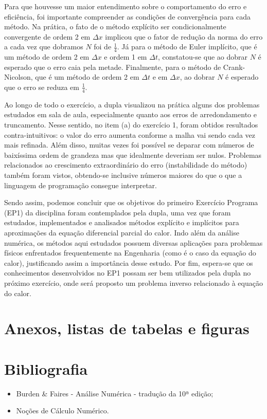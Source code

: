 \documentclass[a4paper, 12pt]{article}
\begin{document}
Para que houvesse um maior entendimento sobre o comportamento do erro e eficiência, foi importante compreender as condições de convergência para cada método. Na prática, o fato de o método explícito ser condicionalmente convergente de ordem 2 em $\Delta x$ implicou que o fator de redução da norma do erro a cada vez que dobramos $N$ foi de $\frac{1}{4}$. Já para o método de Euler implícito, que é um método de ordem 2 em $\Delta x$ e ordem 1 em $\Delta t$, constatou-se que ao dobrar $N$ é esperado que o erro caia pela metade. Finalmente, para o método de Crank-Nicolson, que é um método de ordem 2 em $\Delta t$ e em $\Delta x$, ao dobrar $N$ é esperado que o erro se reduza em $\frac{1}{4}$.

Ao longo de todo o exercício, a dupla visualizou na prática alguns dos problemas estudados em sala de aula, especialmente quanto aos erros de arredondamento e truncamento. Nesse sentido, no item (a) do exercício 1, foram obtidos resultados contra-intuitivos: o valor do erro aumenta conforme a malha vai sendo cada vez mais refinada. Além disso, muitas vezes foi possível se deparar com números de baixíssima ordem de grandeza mas que idealmente deveriam ser nulos. Problemas relacionados ao crescimento extraordinário do erro (instabilidade do método) também foram vistos, obtendo-se inclusive números maiores do que o que a linguagem de programação consegue interpretar.

Sendo assim, podemos concluir que os objetivos do primeiro Exercício Programa (EP1) da disciplina foram contemplados pela dupla, uma vez que foram estudados, implementados e analisados métodos explícito e implícitos para aproximações da equação diferencial parcial do calor. Indo além da análise numérica, os métodos aqui estudados possuem diversas aplicações para problemas físicos enfrentados frequentemente na Engenharia (como é o caso da equação do calor), justificando assim a importância desse estudo. Por fim, espera-se que os conhecimentos desenvolvidos no EP1 possam ser bem utilizados pela dupla no próximo exercício, onde será proposto um problema inverso relacionado à equação do calor.


\section{Anexos, listas de tabelas e figuras}

\listoftables


\listoffigures

\newpage

\section{Bibliografia}

\begin{itemize}
	
	
	\item Burden \& Faires - Análise Numérica - tradução da 10ª edição;
	
	\item Noções de Cálculo Numérico.

	
\end{itemize}
\end{document}
